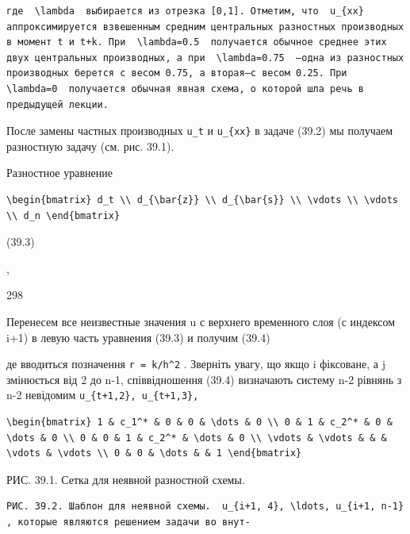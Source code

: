 \documentclass[
  ukrainian,
]{article}
\begin{document}
\begin{verbatim}
где  \lambda  выбирается из отрезка [0,1]. Отметим, что  u_{xx}  аппроксимируется взвешенным средним центральных разностных производных в момент t и t+k. При  \lambda=0.5  получается обычное среднее этих двух центральных производных, а при  \lambda=0.75  —одна из разностных производных берется с весом 0.75, а вторая—с весом 0.25. При  \lambda=0  получается обычная явная схема, о которой шла речь в предыдущей лекции.
\end{verbatim}

После замены частных производных \texttt{u\_t} и \texttt{u\_\{xx\}} в
задаче (39.2) мы получаем разностную задачу (см. рис. 39.1).

Разностное уравнение

\begin{verbatim}
\begin{bmatrix} d_t \\ d_{\bar{z}} \\ d_{\bar{s}} \\ \vdots \\ \vdots \\ d_n \end{bmatrix}
\end{verbatim}

(39.3)

,

298

Перенесем все неизвестные значения u с верхнего временного слоя (с
индексом i+1) в левую часть уравнения (39.3) и получим (39.4)

де вводиться позначення \texttt{r\ =\ k/h\^{}2} . Зверніть увагу, що
якщо i фіксоване, а j змінюється від 2 до n-1, співвідношення (39.4)
визначають систему n-2 рівнянь з n-2 невідомим
\texttt{u\_\{t+1,2\},\ u\_\{t+1,3\},}

\begin{verbatim}
\begin{bmatrix} 1 & c_1^* & 0 & 0 & \dots & 0 \\ 0 & 1 & c_2^* & 0 & \dots & 0 \\ 0 & 0 & 1 & c_2^* & \dots & 0 \\ \vdots & \vdots & & & \vdots & \vdots \\ 0 & 0 & \dots & & 1 \end{bmatrix}
\end{verbatim}

РИС. 39.1. Сетка для неявной разностной схемы.

\begin{verbatim}
РИС. 39.2. Шаблон для неявной схемы.  u_{i+1, 4}, \ldots, u_{i+1, n-1}  , которые являются решением задачи во внут-
\end{verbatim}
\end{document}
